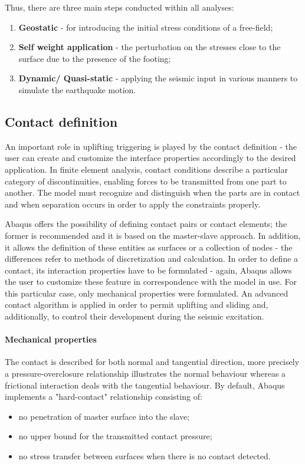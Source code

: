 \documentclass[10pt,a4paper]{report}
\begin{document}
Thus, there are three main steps conducted within all analyses:
\begin{enumerate}
	\item \textbf{Geostatic} - for introducing the initial stress conditions of a free-field;
	\item \textbf{Self weight application} - the perturbation on the stresses close to the surface due to the presence of the footing;
	\item \textbf{Dynamic/ Quasi-static} - applying the seismic input in various manners to simulate the earthquake motion.
\end{enumerate}

\subsection{Contact definition}
An important role in uplifting triggering is played by the contact definition - the user can create and customize the interface properties accordingly to the desired application. In finite element analysis, contact conditions describe a particular category of discontinuities, enabling forces to be transmitted from one part to another. The model must recognize and distinguish when the parts are in contact and when separation occurs in order to apply the constraints properly.

Abaqus offers the possibility of defining contact pairs or contact elements; the former is recommended and it is based on the master-slave approach. In addition, it allows the definition of these entities as surfaces or a collection of nodes - the differences refer to methods of discretization and calculation. In order to define a contact, its interaction properties have to be formulated - again, Abaqus allows the user to customize these feature in correspondence with the model in use. For this particular case, only mechanical properties were formulated. An advanced contact algorithm is applied in order to permit uplifting and sliding and, additionally, to control their development during the seismic excitation.

\paragraph{Mechanical properties}   
The contact is described for both normal and tangential direction, more precisely a pressure-overclosure relationship illustrates the normal behaviour whereas a frictional interaction deals with the tangential behaviour. 
By default, Abaqus implements a "hard-contact" relationship consisting of:
\begin{itemize}
	\item no penetration of master surface into the slave;
	\item no upper bound for the transmitted contact pressure;
	\item no stress transfer between surfaces when there is no contact detected.
\end{itemize}
\end{document}
